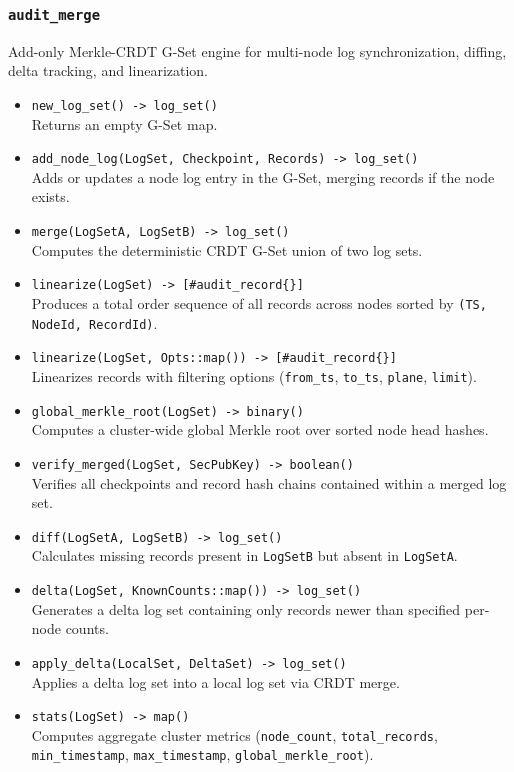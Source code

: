 \documentclass{article}
\begin{document}
\subsubsection{\texttt{audit\_merge}}
Add-only Merkle-CRDT G-Set engine for multi-node log synchronization, diffing, delta tracking, and linearization.
\begin{itemize}
    \item \texttt{new\_log\_set() -> log\_set()} \\
    Returns an empty G-Set map.
    \item \texttt{add\_node\_log(LogSet, Checkpoint, Records) -> log\_set()} \\
    Adds or updates a node log entry in the G-Set, merging records if the node exists.
    \item \texttt{merge(LogSetA, LogSetB) -> log\_set()} \\
    Computes the deterministic CRDT G-Set union of two log sets.
    \item \texttt{linearize(LogSet) -> [\#audit\_record\{\}]} \\
    Produces a total order sequence of all records across nodes sorted by \texttt{(TS, NodeId, RecordId)}.
    \item \texttt{linearize(LogSet, Opts::map()) -> [\#audit\_record\{\}]} \\
    Linearizes records with filtering options (\texttt{from\_ts}, \texttt{to\_ts}, \texttt{plane}, \texttt{limit}).
    \item \texttt{global\_merkle\_root(LogSet) -> binary()} \\
    Computes a cluster-wide global Merkle root over sorted node head hashes.
    \item \texttt{verify\_merged(LogSet, SecPubKey) -> boolean()} \\
    Verifies all checkpoints and record hash chains contained within a merged log set.
    \item \texttt{diff(LogSetA, LogSetB) -> log\_set()} \\
    Calculates missing records present in \texttt{LogSetB} but absent in \texttt{LogSetA}.
    \item \texttt{delta(LogSet, KnownCounts::map()) -> log\_set()} \\
    Generates a delta log set containing only records newer than specified per-node counts.
    \item \texttt{apply\_delta(LocalSet, DeltaSet) -> log\_set()} \\
    Applies a delta log set into a local log set via CRDT merge.
    \item \texttt{stats(LogSet) -> map()} \\
    Computes aggregate cluster metrics (\texttt{node\_count}, \texttt{total\_records}, \texttt{min\_timestamp}, \texttt{max\_timestamp}, \texttt{global\_merkle\_root}).
\end{itemize}
\end{document}
